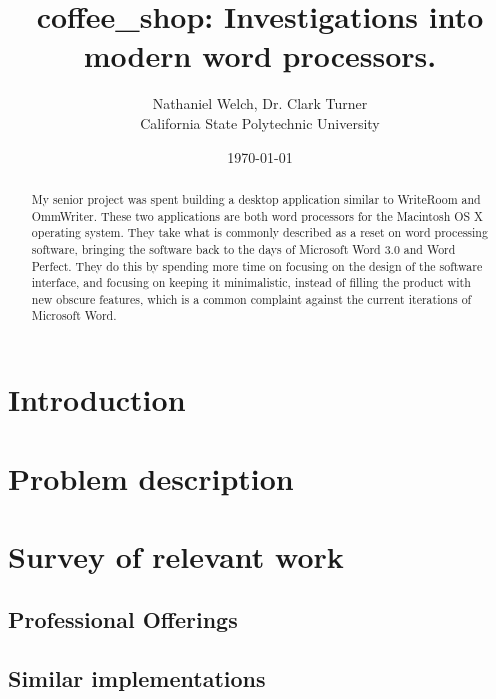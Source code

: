 \documentclass[11pt]{article}
\begin{document}
\title{\vfill coffee\_shop: Investigations into modern word processors.} %
\author{
Nathaniel Welch, Dr. Clark Turner\vspace{10pt} \\
California State Polytechnic University\vspace{10pt} \\
}
\date{\today}
\maketitle

\vfill
\begin{abstract}
My senior project was spent building a desktop application similar to WriteRoom and OmmWriter. These two applications are both word processors for the Macintosh OS X operating system. They take what is commonly described as a reset on word processing software, bringing the software back to the days of Microsoft Word 3.0 and Word Perfect. They do this by spending more time on focusing on the design of the software interface, and focusing on keeping it minimalistic, instead of filling the product with new obscure features, which is a common complaint against the current iterations of Microsoft Word.
\end{abstract}

\thispagestyle{empty}
% 

\newpage

\section{Introduction}

\section{Problem description}

\section{Survey of relevant work}
\subsection{Professional Offerings}
\subsection{Similar implementations}
\end{document}

